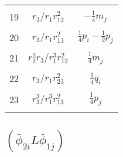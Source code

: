 \documentclass[Dissertation.tex]{subfiles}
\begin{document}
\begin{center}
\begin{longtable}{|c|c|c|}
&  &  \\
19  & $r_3/r_1 r_{12}^2$  & $-\frac{1}{4} m_j$ \\
&  &  \\
20  & $r_3/r_1 r_{13}^2$  & $\frac{1}{4}p_i - \frac{1}{2}p_j$ \\
&  &  \\
21  & $r_2^2 r_3/r_1^3 r_{12}^2$  & $\frac{1}{4}m_j$ \\
&  &  \\
22  & $r_3/r_1 r_{23}^2$  & $\frac{1}{4}q_i$ \\
&  &  \\
23  & $r_3^3/r_1^3 r_{13}^2$  & $\frac{1}{4}p_j$ \\
&  &  \\
\end{longtable}
\end{center}

\subsection[(phi2i L phi1j)]{${(\bar\phi_{2i} L \bar\phi_{1j})}$}
\end{document}
